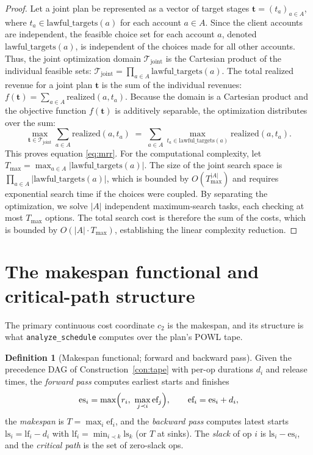 \documentclass[11pt,oneside]{book}
\theoremstyle{definition}
\newtheorem{definition}{Definition}[chapter]
\theoremstyle{plain}
\theoremstyle{remark}
\newcommand{\code}[1]{\texttt{#1}}
\begin{document}
\begin{proof}
Let a joint plan be represented as a vector of target stages $\mathbf{t} = (t_a)_{a \in A}$, where $t_a \in \text{lawful\_targets}(a)$ for each account $a \in A$.%
Since the client accounts are independent, the feasible choice set for each account $a$, denoted $\text{lawful\_targets}(a)$, is independent of the choices made for all other accounts.%
Thus, the joint optimization domain $\mathcal{T}_{\text{joint}}$ is the Cartesian product of the individual feasible sets: $\mathcal{T}_{\text{joint}} = \prod_{a \in A} \text{lawful\_targets}(a)$.%
The total realized revenue for a joint plan $\mathbf{t}$ is the sum of the individual revenues: $f(\mathbf{t}) = \sum_{a \in A} \text{realized}(a, t_a)$.%
Because the domain is a Cartesian product and the objective function $f(\mathbf{t})$ is additively separable, the optimization distributes over the sum:%
\[
\max_{\mathbf{t} \in \mathcal{T}_{\text{joint}}} \sum_{a \in A} \text{realized}(a, t_a) \;=\; \sum_{a \in A} \max_{t_a \in \text{lawful\_targets}(a)} \text{realized}(a, t_a).%
\]
This proves equation \eqref{eq:mrr}.%
For the computational complexity, let $T_{\max} = \max_{a \in A} |\text{lawful\_targets}(a)|$.%
The size of the joint search space is $\prod_{a \in A} |\text{lawful\_targets}(a)|$, which is bounded by $O(T_{\max}^{|A|})$ and requires exponential search time if the choices were coupled.%
By separating the optimization, we solve $|A|$ independent maximum-search tasks, each checking at most $T_{\max}$ options.%
The total search cost is therefore the sum of the costs, which is bounded by $O(|A| \cdot T_{\max})$, establishing the linear complexity reduction.%
\end{proof}

\section{The makespan functional and critical-path structure}
\label{sec:makespan}

The primary continuous cost coordinate $c_2$ is the makespan, and its structure is what
\code{analyze\_schedule} computes over the plan's POWL tape.

\begin{definition}[Makespan functional; forward and backward pass]\label{def:makespan}
Given the precedence DAG of Construction~\ref{con:tape} with per-op durations $d_i$ and release
times, the \emph{forward pass} computes earliest starts and finishes
\[
\text{es}_i=\max\Bigl(r_i,\ \max_{j\prec i}\text{ef}_j\Bigr),\qquad \text{ef}_i=\text{es}_i+d_i,
\]
the \emph{makespan} is $T=\max_i \text{ef}_i$, and the \emph{backward pass} computes latest
starts $\text{ls}_i=\text{lf}_i-d_i$ with $\text{lf}_i=\min_{i\prec k}\text{ls}_k$ (or $T$ at
sinks). The \emph{slack} of op $i$ is $\text{ls}_i-\text{es}_i$, and the \emph{critical path}
is the set of zero-slack ops.
\end{definition}
\end{document}
